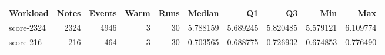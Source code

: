 \begin{tabular}{lrrrrrrrrr}
\hline
Workload & Notes & Events & Warm & Runs & Median & Q1 & Q3 & Min & Max \\
\hline
score-2324 & 2324 & 4946 & 3 & 30 & 5.788159 & 5.689245 & 5.820485 & 5.579121 & 6.109774 \\
score-216 & 216 & 464 & 3 & 30 & 0.703565 & 0.688775 & 0.726932 & 0.674853 & 0.776490 \\
\hline
\end{tabular}
